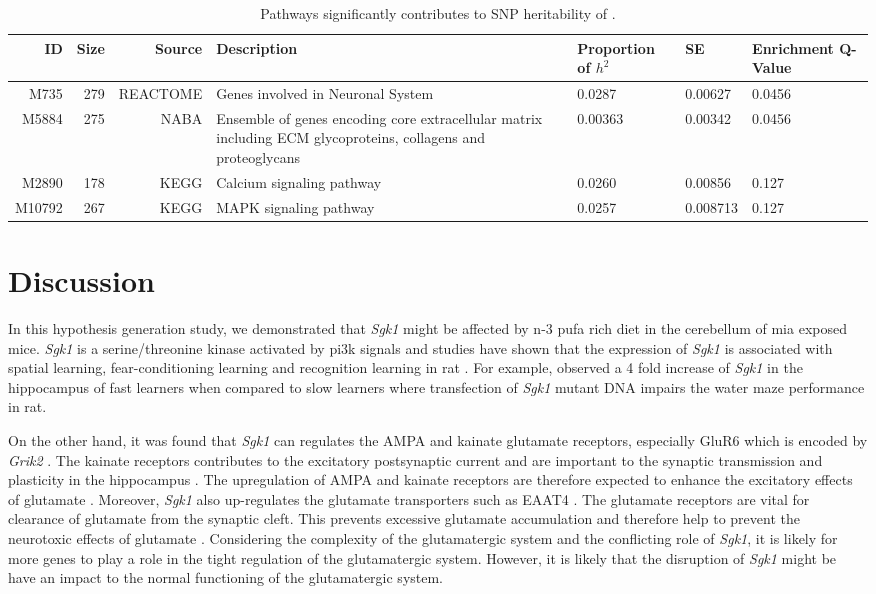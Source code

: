 \documentclass[12pt]{scrbook}
\newcommand*{\glng}{\glsentrylong}
\begin{document}
\begin{landscape}
	\begin{table}
		\begin{tabular}{rrrp{9cm}p{1.7cm}p{1.5cm}p{1.7cm}}
			\toprule
			ID& Size&	Source&	Description&	Proportion of $h^2$&	SE&	Enrichment Q-Value\\
			\midrule
			M735&	279&	REACTOME&	Genes involved in Neuronal System&	0.0287&	0.00627&	0.0456\\
			M5884&	275&	NABA&	Ensemble of genes encoding core extracellular matrix including ECM glycoproteins, collagens and proteoglycans&	0.00363&	0.00342&	0.0456\\
			M2890&	178&	KEGG&	Calcium signaling pathway&	0.0260&	0.00856&	0.127\\
			M10792&	267&	KEGG&	MAPK signaling pathway&	0.0257&	0.008713&	0.127\\	
			\bottomrule
		\end{tabular}
		\caption[Pathways Significantly Contributes to SNP Heritability of Schizophrenia.]{Pathways significantly contributes to \gls{SNP} heritability of \glng{scz}.
		}
		\label{tab:partitioning}
	\end{table}
\end{landscape}

\section{Discussion}
In this hypothesis generation study, we demonstrated that \textit{Sgk1} might be affected by n-3 \gls{pufa} rich diet in the cerebellum of \gls{mia} exposed mice. 
\textit{Sgk1} is a serine/threonine kinase activated by \gls{pi3k} signals and studies have shown that the expression of \textit{Sgk1} is associated with spatial learning, fear-conditioning learning and recognition learning in rat \citep{Tsai2002,Lee2003}.
For example, \citet{Tsai2002} observed a 4 fold increase of \textit{Sgk1} in the hippocampus of fast learners when compared to slow learners where transfection of \textit{Sgk1} mutant DNA impairs the water maze performance in rat.

On the other hand, it was found that \textit{Sgk1} can regulates the AMPA and kainate glutamate receptors, especially GluR6 which is encoded by \textit{Grik2} \citep{Lang2006,Lang2010}.
The kainate receptors contributes to the excitatory postsynaptic current and are important to the synaptic transmission and plasticity in the hippocampus \citep{Lang2006}.
The upregulation of AMPA and kainate receptors are therefore expected to enhance the excitatory effects of glutamate \citep{Lang2010}.
Moreover, \textit{Sgk1} also up-regulates the glutamate transporters such as EAAT4 \citep{Bohmer2004}.
The glutamate receptors are vital for clearance of glutamate from the synaptic cleft.
This prevents excessive glutamate accumulation and therefore help to prevent the neurotoxic effects of glutamate \citep{Lang2010}.
Considering the complexity of the glutamatergic system and the conflicting role of \textit{Sgk1}, it is likely for more genes to play a role in the tight regulation of the glutamatergic system.
However, it is likely that the disruption of \textit{Sgk1} might be have an impact to the normal functioning of the glutamatergic system.
\end{document}
